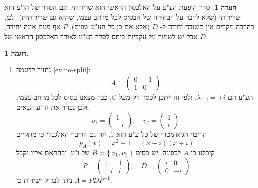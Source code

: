 \documentclass[12pt]{report}
\theoremstyle{plain}
\theoremstyle{definition}
\newtheorem{example}{דוגמה}[chapter]
\newtheorem{remark}{הערה}[chapter]
\newcommand{\C}{\mathbb{C}}
\newcommand{\0}{\mathbf{0}}
\begin{document}
\begin{remark}
סדר הופעת הע"ע על האלכסון הראשי הוא שרירותי, וגם הסדר של הו"ע הוא שרירותי (שלא לדבר על הבחירה של הבסיס לכל מרחב עצמי, שהיא גם שרירותית). לכן, בהרבה מקרים אין תשובה יחידה ל-
$D$
(אלא אם כן
כל הע"ע שווים).
$P$
אף פעם אינה יחידה, אבל יש לשמור על עקביות ביחס לסדר הע"ע לאורך האלכסון הראשי של
$D$.
\end{remark}

\begin{example}\
\begin{enumerate}[label=\alph*.]
\item 
נחזור לדוגמה
\ref{ex:no-split}:
$$
A=\begin{pmatrix}
0 & -1 \\
1 & 0
\end{pmatrix}
$$
הע"ע הם
$\lambda_{1,2}=\pm i$,
ולפי זה ייתכן לכסון רק מעל
$\C$.
כבר מצאנו בסיס לכל מרחב עצמי, ולכן נבחר את הו"ע הבאים:
$$
v_1=\begin{pmatrix}1\\-i\end{pmatrix},\quad v_2=\begin{pmatrix}1\\i\end{pmatrix}
$$
הריבוי הגיאומטרי של כל ע"ע הוא 
$1$,
וזה גם הריבוי האלגברי כי מתקיים
$$
.p_A(x)=x^2+1=(x-i)(x+i)
$$
קיבלנו כי
$A$
לכסינה. יש בסיס 
$B=\Set{v_1,v_2}$
של ו"ע, ובהתאם אליו נקבל
$$
.P=\begin{pmatrix}
1 & 1 \\
-i & i
\end{pmatrix},\quad D=\begin{pmatrix}
i & 0 \\
0 & -i
\end{pmatrix}
$$
ניתן לבדוק ישירות כי
$A=PDP^{-1}$.



\end{enumerate}
\end{example}
\end{document}
